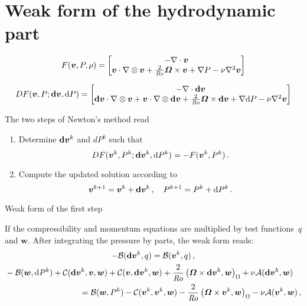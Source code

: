 \section{Weak form of the hydrodynamic part}

\begin{equation}
	F(\bm{v},P,\rho)=
	\begin{bmatrix}
		-\nabla\cdot\bm{v}\\
		\bm{v}\cdot\nabla\otimes\bm{v}+\frac{2}{\mathit{Ro}}\bm{\varOmega}\times\bm{v}+\nabla P-\nu\nabla^2\bm{v}
	\end{bmatrix}
\end{equation}

\begin{equation}
	DF(\bm{v},P;\bm{\mathrm{d}v},\mathrm{d}P)
	=
	\begin{bmatrix}
		-\nabla\cdot\bm{\mathrm{d}v}\\
		\bm{\mathrm{d}v}\cdot\nabla\otimes\bm{v}+\bm{v}\cdot\nabla\otimes\bm{\mathrm{d}v}+\frac{2}{\mathit{Ro}}\bm{\varOmega}\times\bm{\mathrm{d}v}+\nabla\mathrm{d}P-\nu\nabla^2\bm{v}
	\end{bmatrix}
\end{equation}

The two steps of Newton's method read
\begin{enumerate}
	\item Determine $\bm{\mathrm{d}v}^k$ and $d{P}^k$ such that
	\begin{equation}
		DF(\bm{v}^k,P^k;\bm{\mathrm{d}v}^k,\mathrm{d}P^k)=-F(\bm{v}^k,P^k)\,.
	\end{equation}
	\item Compute the updated solution according to
	\begin{equation}
		\bm{v}^{k+1}=\bm{v}^k+\bm{\mathrm{d}v}^k\,,\quad
		P^{k+1}=P^k+\mathrm{d}P^k\,.
	\end{equation}
\end{enumerate}

Weak form of the first step


If the compressibility and momentum equations are multiplied by test functions~$q$ and $\bm{w}$. After integrating the pressure by parts, the weak form reads:
\begin{gather}
-\saddle{\bm{\d{v}}^k}{q}=\saddle{\bm{v}^k}{q}\,,\label{eqn:WeakIncompressibility} \\
\begin{multlined}
	-\saddle{\bm{w}}{\d{P}^k}+\convec{\bm{\d{v}}^k}{\bm{v}}{\bm{w}}+\convec{\bm{v}}{\bm{\d{v}}^k}{\bm{w}}+\frac{2}{\Rossby}\inner{\bm{\varOmega}\times\bm{\d{v}}^k}{\bm{w}}+\nu\elliptic{\bm{\d{v}}^k}{\bm{w}}\\
	=\saddle{\bm{w}}{P^k}-\convec{\bm{v}^k}{\bm{v}^k}{\bm{w}}-\frac{2}{\Rossby}\inner{\bm{\varOmega}\times\bm{v}^k}{\bm{w}}-\nu\elliptic{\bm{v}^k}{\bm{w}}\,,
\end{multlined}\label{eqn:WeakMomentum}
\end{gather}

